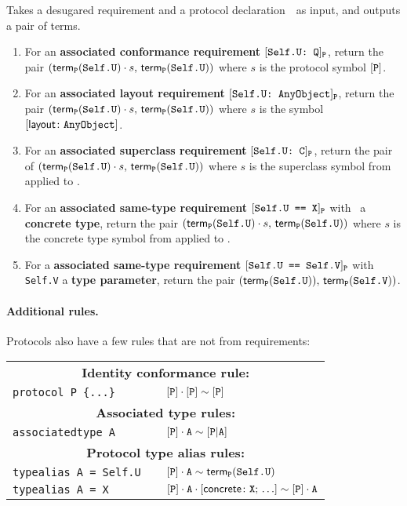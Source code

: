\documentclass[../generics]{subfiles}
\begin{document}
\begin{algorithm}\label{build rule protocol}
Takes a desugared requirement and a protocol declaration~\tP\ as input, and outputs a pair of terms.
\begin{enumerate}
\item For an \textbf{associated conformance requirement} $[\texttt{Self.U:~Q}]_{\texttt{P}}$, return the pair $(\mathsf{term}_{\texttt{P}}(\texttt{Self.U})\cdot s,\,\mathsf{term}_{\texttt{P}}(\texttt{Self.U}))$ where $s$ is the protocol symbol $[\texttt{P}]$.
\item For an \textbf{associated layout requirement} $[\texttt{Self.U:~AnyObject}]_{\texttt{P}}$, return the pair $(\mathsf{term}_{\texttt{P}}(\texttt{Self.U})\cdot s,\,\mathsf{term}_{\texttt{P}}(\texttt{Self.U}))$ where $s$ is the symbol $[\mathsf{layout}\colon\texttt{AnyObject}]$.
\item For an \textbf{associated superclass requirement} $[\texttt{Self.U:~C}]_{\texttt{P}}$, return the pair of $(\mathsf{term}_{\texttt{P}}(\texttt{Self.U})\cdot s,\,\mathsf{term}_{\texttt{P}}(\texttt{Self.U}))$ where $s$ is the superclass symbol from  applied to \tC.
\item For an \textbf{associated same-type requirement} $[\texttt{Self.U == X}]_{\texttt{P}}$ with \tX\ a \textbf{concrete type}, return the pair $(\mathsf{term}_{\texttt{P}}(\texttt{Self.U})\cdot s,\,\mathsf{term}_{\texttt{P}}(\texttt{Self.U}))$ where $s$ is the concrete type symbol from  applied to \tX.
\item For a \textbf{associated same-type requirement} $[\texttt{Self.U == Self.V}]_{\texttt{P}}$ with \texttt{Self.V} a \textbf{type parameter}, return the pair $(\mathsf{term}_{\texttt{P}}(\texttt{Self.U})),\, \mathsf{term}_{\texttt{P}}(\texttt{Self.V}))$.
\end{enumerate}
\end{algorithm}

\paragraph{Additional rules.} Protocols also have a few rules that are not from requirements:
\begin{center}
\begin{tabular}{lll}
\toprule
\multicolumn{3}{c}{\textbf{Identity conformance rule:}}\\
\verb|protocol P {...}|&& $[\texttt{P}]\cdot[\texttt{P}] \sim [\texttt{P}]$\\
\midrule
\multicolumn{3}{c}{\textbf{Associated type rules:}}\\
\verb|associatedtype A|&& $[\texttt{P}]\cdot\texttt{A} \sim [\texttt{P}|\texttt{A}]$\\
\midrule
\multicolumn{3}{c}{\textbf{Protocol type alias rules:}}\\
\verb|typealias A = Self.U|&& $[\texttt{P}]\cdot\texttt{A} \sim \mathsf{term}_{\texttt{P}}(\texttt{Self.U})$\\
\verb|typealias A = X|&& $[\texttt{P}]\cdot\texttt{A} \cdot [\mathsf{concrete}\colon \texttt{X};\, \ldots] \sim [\texttt{P}]\cdot\texttt{A}$\\
\bottomrule
\end{tabular}
\end{center}
\end{document}
